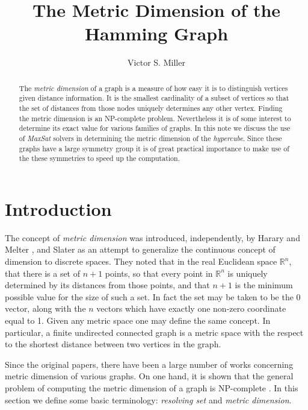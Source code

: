 \documentclass{article}
\title{The Metric Dimension of the Hamming Graph}
\author{Victor S. Miller}
\newcommand{\RR}{\mathbb{R}}
\begin{document}
\maketitle
\begin{abstract}
  The \emph{metric dimension} of a graph is a measure of
  how easy it is to distinguish vertices given distance information.
  It is the smallest cardinality of a subset of vertices so that the set
  of distances from those nodes uniquely determines any other vertex.
  Finding the metric dimension is an NP-complete problem.
  Nevertheless it is of some interest to determine its exact value for
  various families of graphs.  In this note we discuss the use of
  \emph{MaxSat} solvers in determining the metric dimension of the
  \emph{hypercube}.  Since these graphs have a large symmetry group it
  is of great practical importance to make use of the these symmetries
  to speed up the computation.
\end{abstract}

\section{Introduction}
\label{sec:intro}

The concept of \emph{metric dimension} was introduced, independently,
by Harary and Melter \cite{harary1976metric}, and Slater
\cite{slater1975leaves} as an attempt to generalize the continuous
concept of dimension to discrete spaces.  They noted that in the real
Euclidean space $\RR^n$, that there is a set of $n+1$ points, so that
every point in $\RR^n$ is uniquely determined by its distances from
those points, and that $n+1$ is the minimum possible value for the
size of such a set.  In fact the set may be taken to be the 0 vector,
along with the $n$ vectors which have exactly one non-zero coordinate
equal to 1.  Given any metric space one may define the same concept.
In particular, a finite undirected connected graph is a metric space
with the respect to the shortest distance between two vertices in the
graph.

Since the original papers, there have been a large number of works
concerning metric dimension of various graphs.  On one hand, it is
shown that the general problem of computing the metric dimension of a
graph is NP-complete \cite[GT61]{garey1979computers}
\cite{khuller1996landmarks,diaz2012complexity,hauptmann2012approximation}.
In this section we define some basic terminology: \emph{resolving set}
and \emph{metric dimension}.
\end{document}
